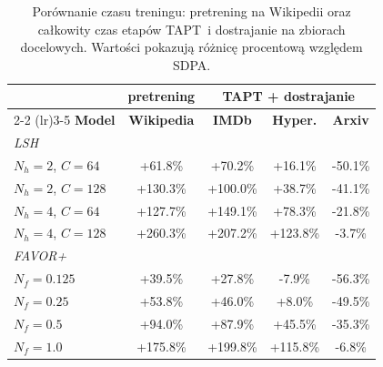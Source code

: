 \documentclass[a4paper,11pt,twoside]{report}
\theoremstyle{definition}
\begin{document}
\begin{table}[t!]
\centering
\caption{Porównanie czasu treningu: pretrening na Wikipedii oraz całkowity czas etapów TAPT~i dostrajanie  na zbiorach docelowych. Wartości pokazują różnicę procentową względem SDPA.}
\label{tab:time-comparison}
\smallskip

\begin{tabular}{@{}lcccc@{}}
\toprule
& \textbf{pretrening} & \multicolumn{3}{c}{\textbf{TAPT + dostrajanie}} \\
\cmidrule(lr){2-2}
\cmidrule(lr){3-5}
\textbf{Model} & \textbf{Wikipedia} & \textbf{IMDb} & \textbf{Hyper.} & \textbf{Arxiv} \\
\midrule
\multicolumn{5}{l}{\textit{LSH}} \\
$N_h{=}2$, $C{=}64$ & +61.8\% & +70.2\% & +16.1\% & -50.1\% \\
$N_h{=}2$, $C{=}128$ & +130.3\% & +100.0\% & +38.7\% & -41.1\% \\
$N_h{=}4$, $C{=}64$ & +127.7\% & +149.1\% & +78.3\% & -21.8\% \\
$N_h{=}4$, $C{=}128$ & +260.3\% & +207.2\% & +123.8\% & -3.7\% \\
\midrule
\multicolumn{5}{l}{\textit{FAVOR+}} \\
$N_f{=}0.125$ & +39.5\% & +27.8\% & -7.9\% & -56.3\% \\
$N_f{=}0.25$ & +53.8\% & +46.0\% & +8.0\% & -49.5\% \\
$N_f{=}0.5$ & +94.0\% & +87.9\% & +45.5\% & -35.3\% \\
$N_f{=}1.0$ & +175.8\% & +199.8\% & +115.8\% & -6.8\% \\
\bottomrule
\end{tabular}
\end{table}
\end{document}

